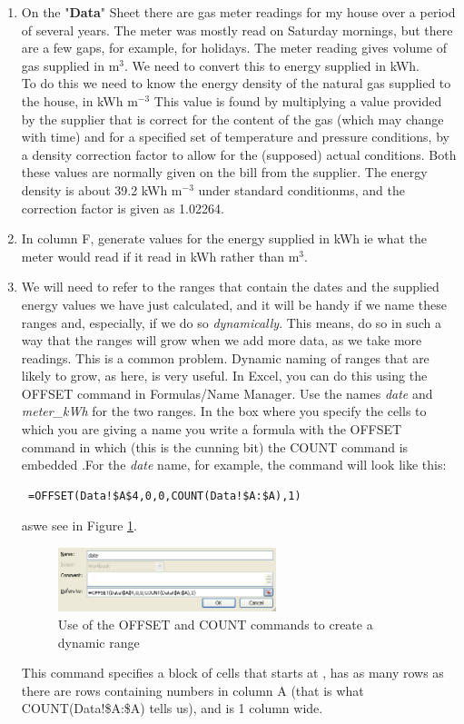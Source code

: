 \documentclass{article}
\begin{document}
\begin{enumerate}
\item On the "\textbf{Data}" Sheet there are gas meter readings for my house over a period of several years. The meter was mostly read on Saturday mornings, but there are a few gaps, for example, for holidays. The meter reading gives volume of gas supplied in m$^3$. We need to convert this to energy supplied in kWh.\\
To do this we need to know the energy density of the natural gas supplied to the house, in kWh m$^{-3}$ This value is found by multiplying a value provided by the supplier that is correct for the content of the gas (which may change with time) and for a specified set of temperature and pressure conditions, by a density correction factor to allow for the (supposed) actual conditions. Both these values are normally given on the bill from the supplier. The energy density is about 39.2 kWh m$^{-3}$ under standard conditionms, and the correction factor is given as 1.02264.
\item In column F, generate values for the energy supplied in kWh ie what the meter would read if it read in kWh rather than m$^3$. 
\item We will need to refer to the ranges that contain the dates and the supplied energy values we have just calculated, and it will be handy if we name these ranges and, especially, if we do so \emph{dynamically}. This means, do so in such a way that the ranges will grow when we add more data, as we take more readings. This is a common problem. Dynamic naming of ranges that are likely to grow, as here, is very useful. In Excel, you can do this using the {\color{blue}OFFSET} command in Formulas/Name Manager.
Use the names \emph{date} and \emph{meter\_kWh} for the two ranges. In the box where you specify the cells to which you are giving a name you write a formula with the {\color{blue}OFFSET} command in which (this is the cunning bit) the {\color{blue}COUNT} command is embedded .For the \emph{date} name, for example, the command will look like this:
{\color{blue}
\begin{verbatim}
 =OFFSET(Data!$A$4,0,0,COUNT(Data!$A:$A),1)
 \end{verbatim}
}
aswe see in Figure \ref{fig:dynamicrange}.
\begin{figure}
\includegraphics[width=0.6\textwidth]{dynamicrange}
\caption{Use of the {\color{blue}OFFSET} and {\color{blue}COUNT} commands to create a dynamic range}
\label{fig:dynamicrange}
\end{figure}
This command specifies a block of cells that starts at {\color{blue}{\$A\$4}}, has as many rows as there are rows containing numbers in column A (that is what {\color{blue}COUNT(Data!\$A:\$A)} tells us), and is 1 column wide.
\end{enumerate}
\end{document}
